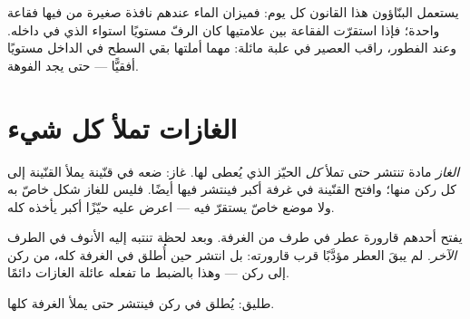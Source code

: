 \begin{example}\label{ex:g3:solids-liquids-gases:level}
يستعمل البنّاؤون هذا القانون كل يوم: فميزان الماء عندهم نافذة
صغيرة من  فيها فقاعة واحدة؛ فإذا استقرّت الفقاعة بين
علامتيها كان الرفّ مستويًا استواء  الذي في داخله. وعند
الفطور، راقب العصير في علبة مائلة: مهما أملتها بقي السطح في
الداخل مستويًا أفقيًّا --- حتى يجد الفوهة.
\end{example}

\section{الغازات تملأ كل شيء}

\begin{definition}[الغاز]\label{def:g3:solids-liquids-gases:gas}
\emph{الغاز} مادة تنتشر حتى تملأ \emph{كل} الحيّز الذي
يُعطى لها.  غاز: ضعه في قنّينة يملأ القنّينة إلى كل ركن
منها؛ وافتح القنّينة في غرفة أكبر فينتشر فيها أيضًا. فليس للغاز
شكل خاصّ به ولا موضع خاصّ يستقرّ فيه --- اعرض عليه حيّزًا أكبر
يأخذه كله.
\end{definition}

\begin{example}\label{ex:g3:solids-liquids-gases:perfume}
يفتح أحدهم قارورة عطر في طرف من الغرفة. وبعد لحظة تنتبه إليه
الأنوف في الطرف \emph{الآخر}. لم يبقَ  العطر مؤدَّبًا قرب
قارورته: بل انتشر حين أُطلق في  الغرفة كله، من ركن إلى ركن
--- وهذا بالضبط ما تفعله عائلة الغازات دائمًا.
\end{example}

\begin{omfigure}

{\small {} طليق: يُطلق في ركن فينتشر حتى يملأ الغرفة كلها.}
\end{omfigure}

